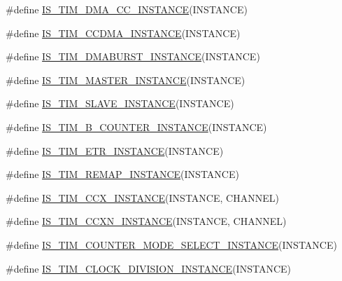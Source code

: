 \begin{DoxyCompactItemize}
\item 
\#define \hyperlink{group___exported__macros_gad80a186286ce3daa92249a8d52111aaf}{I\+S\+\_\+\+T\+I\+M\+\_\+\+D\+M\+A\+\_\+\+C\+C\+\_\+\+I\+N\+S\+T\+A\+N\+CE}(I\+N\+S\+T\+A\+N\+CE)
\item 
\#define \hyperlink{group___exported__macros_ga8111ef18a809cd882ef327399fdbfc8f}{I\+S\+\_\+\+T\+I\+M\+\_\+\+C\+C\+D\+M\+A\+\_\+\+I\+N\+S\+T\+A\+N\+CE}(I\+N\+S\+T\+A\+N\+CE)
\item 
\#define \hyperlink{group___exported__macros_ga1ed43d4e9823446a1b9d43afc452f42e}{I\+S\+\_\+\+T\+I\+M\+\_\+\+D\+M\+A\+B\+U\+R\+S\+T\+\_\+\+I\+N\+S\+T\+A\+N\+CE}(I\+N\+S\+T\+A\+N\+CE)
\item 
\#define \hyperlink{group___exported__macros_ga98104b1522d066b0c20205ca179d0eba}{I\+S\+\_\+\+T\+I\+M\+\_\+\+M\+A\+S\+T\+E\+R\+\_\+\+I\+N\+S\+T\+A\+N\+CE}(I\+N\+S\+T\+A\+N\+CE)
\item 
\#define \hyperlink{group___exported__macros_ga3ba7d4187dba8dfb4ffd610312e8af14}{I\+S\+\_\+\+T\+I\+M\+\_\+\+S\+L\+A\+V\+E\+\_\+\+I\+N\+S\+T\+A\+N\+CE}(I\+N\+S\+T\+A\+N\+CE)
\item 
\#define \hyperlink{group___exported__macros_gac41867bf288927ff8ff10a85e67a591b}{I\+S\+\_\+\+T\+I\+M\+\_\+B\+\_\+\+C\+O\+U\+N\+T\+E\+R\+\_\+\+I\+N\+S\+T\+A\+N\+CE}(I\+N\+S\+T\+A\+N\+CE)
\item 
\#define \hyperlink{group___exported__macros_gac71942c3817f1a893ef84fefe69496b7}{I\+S\+\_\+\+T\+I\+M\+\_\+\+E\+T\+R\+\_\+\+I\+N\+S\+T\+A\+N\+CE}(I\+N\+S\+T\+A\+N\+CE)
\item 
\#define \hyperlink{group___exported__macros_ga6bb03cf116b07bfe1bd527f8ab61a7f9}{I\+S\+\_\+\+T\+I\+M\+\_\+\+R\+E\+M\+A\+P\+\_\+\+I\+N\+S\+T\+A\+N\+CE}(I\+N\+S\+T\+A\+N\+CE)
\item 
\#define \hyperlink{group___exported__macros_ga6517a51ea79512a42bc53c718a77f18e}{I\+S\+\_\+\+T\+I\+M\+\_\+\+C\+C\+X\+\_\+\+I\+N\+S\+T\+A\+N\+CE}(I\+N\+S\+T\+A\+N\+CE,  C\+H\+A\+N\+N\+EL)
\item 
\#define \hyperlink{group___exported__macros_ga7181cfd1649c4e65e24b7c863e94a54f}{I\+S\+\_\+\+T\+I\+M\+\_\+\+C\+C\+X\+N\+\_\+\+I\+N\+S\+T\+A\+N\+CE}(I\+N\+S\+T\+A\+N\+CE,  C\+H\+A\+N\+N\+EL)
\item 
\#define \hyperlink{group___exported__macros_gaac0e3e7e7a18fd8eb81734b2baf9e3be}{I\+S\+\_\+\+T\+I\+M\+\_\+\+C\+O\+U\+N\+T\+E\+R\+\_\+\+M\+O\+D\+E\+\_\+\+S\+E\+L\+E\+C\+T\+\_\+\+I\+N\+S\+T\+A\+N\+CE}(I\+N\+S\+T\+A\+N\+CE)
\item 
\#define \hyperlink{group___exported__macros_gac54b9f42e8ab07c41abe7d96d13d698a}{I\+S\+\_\+\+T\+I\+M\+\_\+\+C\+L\+O\+C\+K\+\_\+\+D\+I\+V\+I\+S\+I\+O\+N\+\_\+\+I\+N\+S\+T\+A\+N\+CE}(I\+N\+S\+T\+A\+N\+CE)

\end{DoxyCompactItemize}
